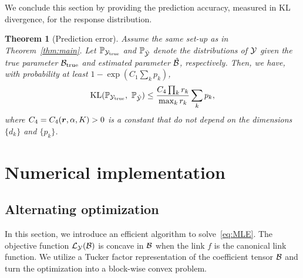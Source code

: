 \documentclass[12pt]{article}
\theoremstyle{plain}
\newtheorem{thm}{Theorem}[section]
\theoremstyle{definition}
\begin{document}
We conclude this section by providing the prediction accuracy, measured in KL divergence, for the response distribution.   

\begin{thm}[Prediction error]\label{thm:KL}
Assume the same set-up as in Theorem~\ref{thm:main}. Let $\mathbb{P}_{\mathcal{Y}_{\text{true}}}$ and $\mathbb{P}_{\hat {\mathcal{Y}}}$ denote the distributions of $\mathcal{Y}$ given the true parameter $\mathcal{B}_{\text{true}}$ and estimated parameter $\hat {\mathcal{B}}$, respectively. Then, we have, with probability at least $1-\exp(C_1\sum_k p_k)$,
\[
\text{KL}(\mathbb{P}_{\tY_{\text{true}}},\ \mathbb{P}_{\hat \tY})\leq \frac{ C_{4}\prod_kr_k}{\max_k r_k} \sum_k p_k,
\]
where $C_4=C_4(\bm{r},\alpha, K)>0$ is a constant that do not depend on the dimensions $\{d_k\}$ and $\{p_k\}$.
\end{thm}




\section{Numerical implementation}
\subsection{Alternating optimization} \label{subsec:alg}
In this section, we introduce an efficient algorithm to solve~\eqref{eq:MLE}. The objective function $\mathcal{L}_{\mathcal{Y}}(\mathcal{B})$ is concave in $\mathcal{B}$ when the link $f$ is the canonical link function. We utilize a Tucker factor representation of the coefficient tensor $\mathcal{B}$ and turn the optimization into a block-wise convex problem. 
\end{document}
